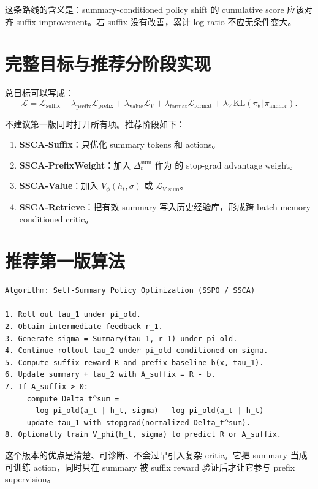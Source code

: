 \documentclass[10pt]{ctexart}
\begin{document}
这条路线的含义是：summary-conditioned policy shift 的 cumulative score 应该对齐 suffix improvement。若 suffix 没有改善，累计 log-ratio 不应无条件变大。

\section{完整目标与推荐分阶段实现}
总目标可以写成：
\begin{equation}
  \mathcal{L}
  = \mathcal{L}_{\mathrm{suffix}}
  + \lambda_{\mathrm{prefix}}\mathcal{L}_{\mathrm{prefix}}
  + \lambda_{\mathrm{value}}\mathcal{L}_{V}
  + \lambda_{\mathrm{format}}\mathcal{L}_{\mathrm{format}}
  + \lambda_{\mathrm{kl}}\mathrm{KL}(\pi_\theta\Vert\pi_{\mathrm{anchor}}).
\end{equation}

不建议第一版同时打开所有项。推荐阶段如下：
\begin{enumerate}
  \item \textbf{SSCA-Suffix}：只优化 summary tokens 和  actions。
  \item \textbf{SSCA-PrefixWeight}：加入 $\Delta_t^{\mathrm{sum}}$ 作为  的 stop-grad advantage weight。
  \item \textbf{SSCA-Value}：加入 $V_\phi(h_t,\sigma)$ 或 $\mathcal{L}_{V,\mathrm{sum}}$。
  \item \textbf{SSCA-Retrieve}：把有效 summary 写入历史经验库，形成跨 batch memory-conditioned critic。
\end{enumerate}

\section{推荐第一版算法}
\begin{lstlisting}
Algorithm: Self-Summary Policy Optimization (SSPO / SSCA)

1. Roll out tau_1 under pi_old.
2. Obtain intermediate feedback r_1.
3. Generate sigma = Summary(tau_1, r_1) under pi_old.
4. Continue rollout tau_2 under pi_old conditioned on sigma.
5. Compute suffix reward R and prefix baseline b(x, tau_1).
6. Update summary + tau_2 with A_suffix = R - b.
7. If A_suffix > 0:
     compute Delta_t^sum =
       log pi_old(a_t | h_t, sigma) - log pi_old(a_t | h_t)
     update tau_1 with stopgrad(normalized Delta_t^sum).
8. Optionally train V_phi(h_t, sigma) to predict R or A_suffix.
\end{lstlisting}

这个版本的优点是清楚、可诊断、不会过早引入复杂 critic。它把 summary 当成可训练 action，同时只在 summary 被 suffix reward 验证后才让它参与 prefix supervision。
\end{document}
